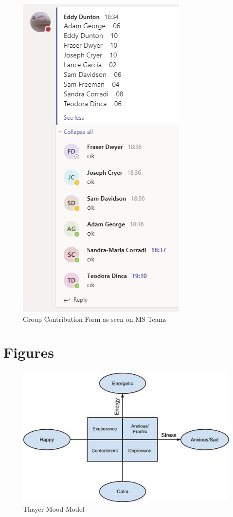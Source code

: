 \documentclass[10pt]{report}
\begin{document}
\begin{figure}[!h]
	\includegraphics{gcf.png}
	\caption{Group Contribution Form as seen on MS Teams}
	\label{fig:gcf}
\end{figure}

\newpage

\section{Figures}

\begin{figure}[h]
	\includegraphics[width=\linewidth]{thayer-mood-model.png}
	\caption{Thayer Mood Model}
	\label{fig:thayermoodmodel}
\end{figure}
\end{document}
